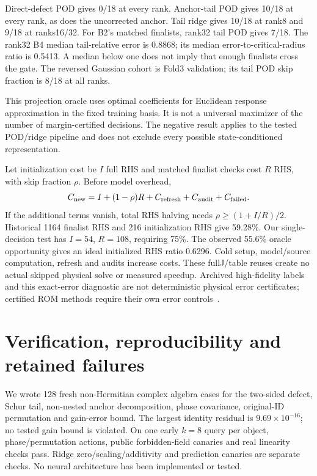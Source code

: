 \documentclass[11pt,a4paper]{article}
\begin{document}
Direct-defect POD gives 0/18 at every rank. Anchor-tail POD gives 10/18 at every rank, as does the uncorrected anchor. Tail ridge gives 10/18 at rank8 and 9/18 at ranks16/32. For B2's matched finalists, rank32 tail POD gives 7/18. The rank32 B4 median tail-relative error is 0.8868; its median error-to-critical-radius ratio is 0.5413. A median below one does not imply that enough finalists cross the gate. The reversed Gaussian cohort is Fold3 validation; its tail POD skip fraction is 8/18 at all ranks.

This projection oracle uses optimal coefficients for Euclidean response approximation in the fixed training basis. It is not a universal maximizer of the number of margin-certified decisions. The negative result applies to the tested POD/ridge pipeline and does not exclude every possible state-conditioned representation.

Let initialization cost be $I$ full RHS and matched finalist checks cost $R$ RHS, with skip fraction $\rho$. Before model overhead,
\begin{equation}
 C_{\rm new}=I+(1-\rho)R+C_{\rm refresh}+C_{\rm audit}+C_{\rm failed}.
\end{equation}
If the additional terms vanish, total RHS halving needs $\rho\geq(1+I/R)/2$. Historical 1164 finalist RHS and 216 initialization RHS give 59.28\%. Our single-decision test has $I=54$, $R=108$, requiring 75\%. The observed 55.6\% oracle opportunity gives an ideal initialized RHS ratio 0.6296. Cold setup, model/source computation, refresh and audits increase costs. These fullJ/table reuses create no actual skipped physical solve or measured speedup. Archived high-fidelity labels and this exact-error diagnostic are not deterministic physical error certificates; certified ROM methods require their own error controls~\cite{cert}.

\section{Verification, reproducibility and retained failures}
We wrote 128 fresh non-Hermitian complex algebra cases for the two-sided defect, Schur tail, non-nested anchor decomposition, phase covariance, original-ID permutation and gain-error bound. The largest identity residual is $9.69\times10^{-16}$; no tested gain bound is violated. On one early $k=8$ query per object, phase/permutation actions, public forbidden-field canaries and real linearity checks pass. Ridge zero/scaling/additivity and prediction canaries are separate checks. No neural architecture has been implemented or tested.
\end{document}
